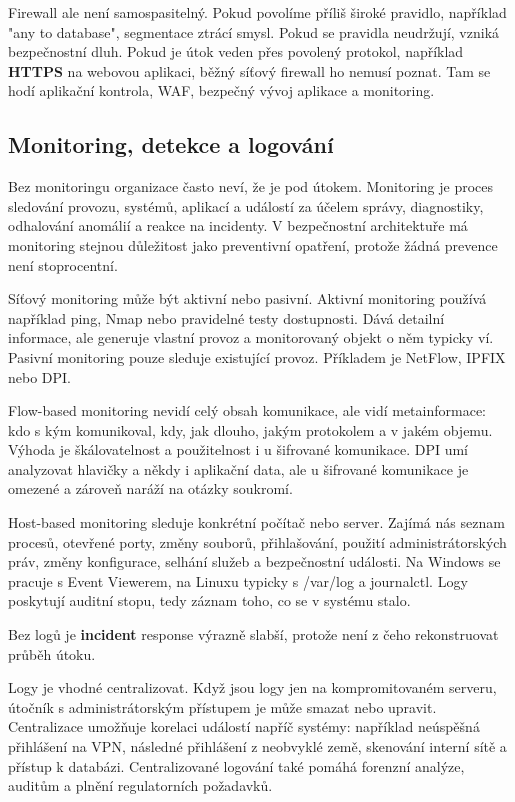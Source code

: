 Firewall ale není samospasitelný. Pokud povolíme příliš široké pravidlo, například "any to database", segmentace ztrácí smysl. Pokud se pravidla neudržují, vzniká bezpečnostní dluh. Pokud je útok veden přes povolený protokol, například \textbf{HTTPS} na webovou aplikaci, běžný síťový firewall ho nemusí poznat. Tam se hodí aplikační kontrola, WAF, bezpečný vývoj aplikace a monitoring.

\subsection*{Monitoring, detekce a logování}

Bez monitoringu organizace často neví, že je pod útokem. Monitoring je proces sledování provozu, systémů, aplikací a událostí za účelem správy, diagnostiky, odhalování anomálií a reakce na incidenty. V bezpečnostní architektuře má monitoring stejnou důležitost jako preventivní opatření, protože žádná prevence není stoprocentní.

Síťový monitoring může být aktivní nebo pasivní. Aktivní monitoring používá například ping, Nmap nebo pravidelné testy dostupnosti. Dává detailní informace, ale generuje vlastní provoz a monitorovaný objekt o něm typicky ví. Pasivní monitoring pouze sleduje existující provoz. Příkladem je NetFlow, IPFIX nebo DPI.

Flow-based monitoring nevidí celý obsah komunikace, ale vidí metainformace: kdo s kým komunikoval, kdy, jak dlouho, jakým protokolem a v jakém objemu. Výhoda je škálovatelnost a použitelnost i u šifrované komunikace. DPI umí analyzovat hlavičky a někdy i aplikační data, ale u šifrované komunikace je omezené a zároveň naráží na otázky soukromí.

Host-based monitoring sleduje konkrétní počítač nebo server. Zajímá nás seznam procesů, otevřené porty, změny souborů, přihlašování, použití administrátorských práv, změny konfigurace, selhání služeb a bezpečnostní události. Na Windows se pracuje s Event Viewerem, na Linuxu typicky s /var/log a journalctl. Logy poskytují auditní stopu, tedy záznam toho, co se v systému stalo.

Bez logů je \textbf{incident} response výrazně slabší, protože není z čeho rekonstruovat průběh útoku.

Logy je vhodné centralizovat. Když jsou logy jen na kompromitovaném serveru, útočník s administrátorským přístupem je může smazat nebo upravit. Centralizace umožňuje korelaci událostí napříč systémy: například neúspěšná přihlášení na VPN, následné přihlášení z neobvyklé země, skenování interní sítě a přístup k databázi. Centralizované logování také pomáhá forenzní analýze, auditům a plnění regulatorních požadavků.

